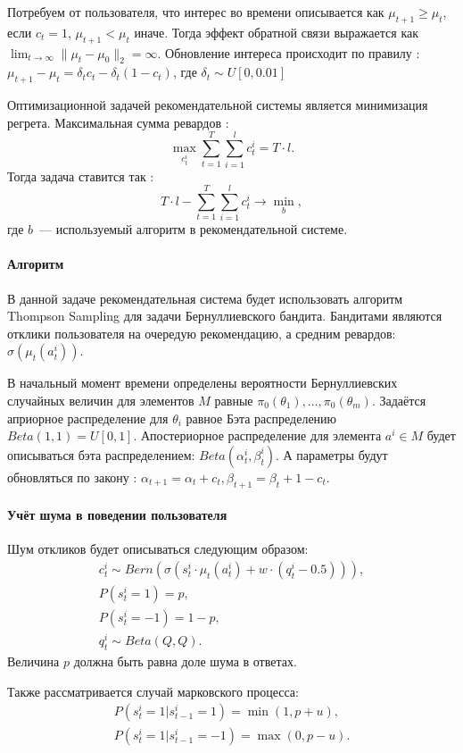 \documentclass[12pt, twoside]{article}
\begin{document}
Потребуем от пользователя, что интерес во времени описывается как $\mu_{t+1} \geq \mu_{t}$, если $c_t = 1$,  $\mu_{t+1} < \mu_{t}$ иначе. 
Тогда эффект обратной связи выражается как $\lim_{t \to \infty} \|\mu_t - \mu_0 \|_2 = \infty$.
Обновление интереса происходит по правилу : 
$\mu_{t+1} - \mu_{t} = \delta_t c_t - \delta_t (1 - c_t)$, 
где $\delta_t \sim U[0, 0.01]$

Оптимизационной задачей рекомендательной системы является минимизация регрета. 
Максимальная сумма ревардов : \[ \max_{c_t^i} \sum_{t = 1}^T \sum_{i = 1}^l c_t^i = T \cdot l.\] 
Тогда задача ставится так : 
\[
  T \cdot l - \sum_{t = 1}^T \sum_{i = 1}^l c_t^i \to \min_{b}, 
\]
где $b$~--- используемый алгоритм в рекомендательной системе. 

\paragraph{Алгоритм}
В данной задаче рекомендательная система будет использовать алгоритм Thompson Sampling для задачи Бернуллиевского бандита.  
Бандитами являются отклики пользователя на очередую рекомендацию, а средним ревардов: $\sigma(\mu_t(a_t^i))$.

В начальный момент времени определены вероятности Бернуллиевских случайных величин для элементов $M$ равные $\pi_0(\theta_1), \dots, \pi_0(\theta_m)$. 
Задаётся априорное распределение для $\theta_i$ равное Бэта распределению $Beta(1, 1) = U[0, 1]$. 
Апостериорное распределение для элемента $a^i \in M$ будет описываться бэта распределением: $Beta(\alpha_t^i, \beta_t^i)$. 
А параметры будут обновляться по закону :
$\alpha_{t+1} = \alpha_t + c_t, \beta_{t+1} = \beta_t + 1 - c_t$.

\paragraph{Учёт шума в поведении пользователя}
Шум откликов будет описываться следующим образом: 
\begin{gather*}
  c_t^i \sim Bern (\sigma(s_t^i \cdot \mu_t(a_t^i) + w \cdot (q_t^i - 0.5))), \\
  P(s_t^i = 1) = p, \\ P(s_t^i = -1) = 1 - p, \\
  q_t^i \sim Beta (Q, Q).
\end{gather*}
Величина $p$ должна быть равна доле шума в ответах. 

Также рассматривается случай марковского процесса: 
\begin{gather*}
  P(s_t^i = 1 | s_{t-1}^i = 1) = \min(1, p + u), \\ 
  P(s_t^i = 1 | s_{t-1}^i = -1) = \max(0, p - u). 
\end{gather*}
\end{document}
